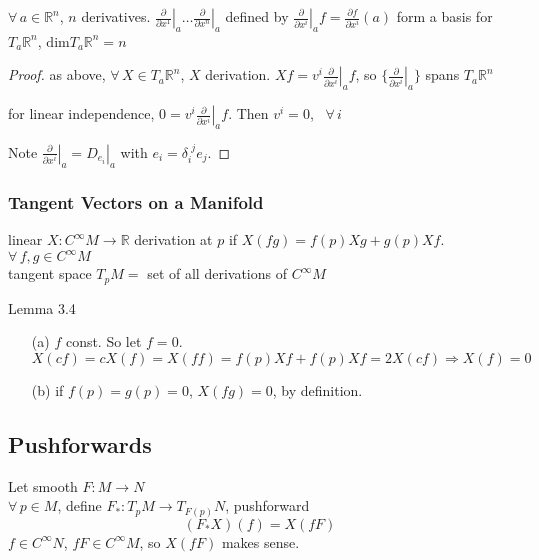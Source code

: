 \begin{corollary}[3.3]
$\forall \, a \in \mathbb{R}^n$, $n$ derivatives.  $ \left. \frac{ \partial }{ \partial x^1 } \right|_a \dots \left. \frac{ \partial }{ \partial x^n} \right|_a$ defined by $ \left. \frac{ \partial }{ \partial x^i} \right|_a f = \frac{ \partial f}{ \partial x^i}(a)$ form a basis for $T_a \mathbb{R}^n$, $\text{dim}{ T_a \mathbb{R}^n} = n$
\end{corollary}

\begin{proof}
as above, $\forall \, X \in T_a\mathbb{R}^n$, $X$ derivation.  $Xf = v^i \left. \frac{ \partial }{ \partial x^i } \right|_a f $, so $\lbrace  \left. \frac{ \partial }{ \partial x^i } \right|_a \rbrace$ spans $T_a \mathbb{R}^n$

for linear independence, $0 = v^i \left. \frac{ \partial }{ \partial x^i } \right|_a f$.  Then $v^i = 0$, \, $\forall \, i$

Note $\left. \frac{ \partial }{ \partial x^i } \right|_a = \left. D_{e_i} \right|_a$ with $e_i = \delta_i^{\, \, j} e_j$.  

\end{proof}

\subsubsection*{Tangent Vectors on a Manifold}

linear $X: C^{\infty}M  \to \mathbb{R}$ derivation at $p$ if $X(fg) = f(p) Xg + g(p) Xf$.  $\forall\, f,g \in C^{\infty}M$  \\
tangent space $T_pM = $ set of all derivations of $C^{\infty}M$

 Lemma 3.4
\begin{enumerate}
\item[(a)] $f$ const. So let $f=0$.  
\[
X(cf) = cX(f) = X(ff) = f(p) Xf + f(p) Xf = 2X(cf) \Longrightarrow X(f) = 0 
\]
\item[(b)] if $f(p) = g(p) = 0 $, $X(fg) = 0$, by definition.  
\end{enumerate}


\subsection*{Pushforwards}

Let smooth $F: M \to N$  \\ $\forall \, p \in M$, define $F_* : T_p M \to T_{F(p)}N$, pushforward
\[
(F_*X)(f) = X(fF)
\]
$f\in C^{\infty}N$, $fF \in C^{\infty}M$, so $X(fF)$ makes sense.  

